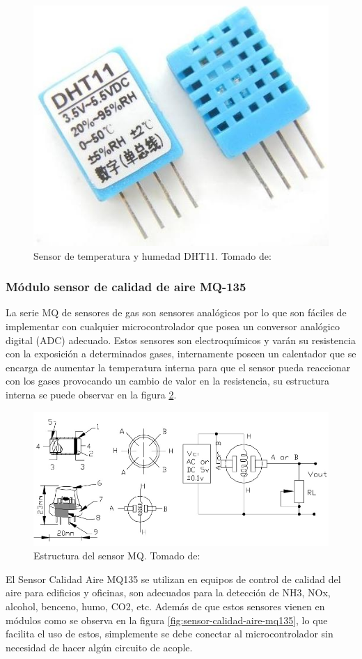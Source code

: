 \begin{figure}[H]
	\centering
	\caption{Sensor de temperatura y humedad DHT11. Tomado de: \cite{DHT11}}
	\label{fig:dht11}
	\includegraphics[width=0.4\linewidth]{Imagenes/dht11}
\end{figure}


\subsubsection{Módulo sensor de calidad de aire MQ-135}

La serie MQ de sensores de gas son sensores analógicos por lo que son fáciles de implementar con cualquier microcontrolador que posea un conversor analógico digital (ADC) adecuado. Estos sensores son electroquímicos y varán su resistencia con la exposición a determinados gases, internamente poseen un calentador que se encarga de aumentar la temperatura interna para que el sensor pueda reaccionar con los gases provocando un cambio de valor en la resistencia, su estructura interna se puede observar en la figura \ref{fig:estructura-del-sensor-mq}.\cite{MQ1}

\begin{figure}[H]
	\centering
	\caption{Estructura del sensor MQ. Tomado de: \cite{MQ1}}
	\label{fig:estructura-del-sensor-mq}
	\includegraphics[width=0.7\linewidth]{Imagenes/Estructura_del_sensor_MQ}
\end{figure}

El Sensor Calidad Aire MQ135 se utilizan en equipos de control de calidad del aire para edificios y oficinas, son adecuados para la detección de NH3, NOx, alcohol, benceno, humo, CO2, etc. Además de que estos sensores vienen en módulos como se observa en la figura \ref{fig:sensor-calidad-aire-mq135}, lo que facilita el uso de estos, simplemente se debe conectar al microcontrolador sin necesidad de hacer algún circuito de acople. \cite{MQ1}

